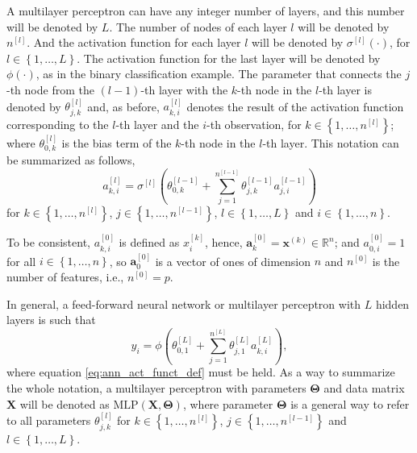 A multilayer perceptron can have any integer number of layers, and this number will be denoted by $L$. The number of nodes of each layer $l$ will be denoted by $n^{[l]}$. And the activation function for each layer $l$ will be denoted by $\sigma^{[l]}(\cdot)$, for $l \in \left\{ 1, \ldots, L \right\}$. The activation function for the last layer will be denoted by $\phi(\cdot)$, as in the binary classification example. The parameter that connects the $j$-th node from the $(l-1)$-th layer with the $k$-th node in the $l$-th layer is denoted by $\theta_{j,k}^{[l]}$ and, as before, $a_{k,i}^{[l]}$ denotes the result of the activation function corresponding to the $l$-th layer and the $i$-th observation, for $k \in \left\{ 1, \ldots, n^{[l]} \right\}$; where $\theta_{0,k}^{[l]}$ is the bias term of the $k$-th node in the $l$-th layer. This notation can be summarized as follows,
\begin{equation}
  \label{eq:ann_act_funct_def}
  a_{k,i}^{[l]} = \sigma^{[l]} \left( \theta_{0,k}^{[l-1]} + \sum_{j = 1}^{n^{[l-1]}} \theta_{j,k}^{[l-1]} a_{j,i}^{[l-1]} \right)
\end{equation}
for $k \in \left\{ 1, \ldots, n^{[l]} \right\}$, $j \in \left\{ 1, \ldots, n^{[l-1]} \right\}$, $l \in \left\{ 1, \ldots, L \right\}$ and $i \in \left\{ 1, \ldots, n \right\}$.

To be consistent, $a_{k,i}^{[0]}$ is defined as $x_i^{[k]}$, hence, $\boldsymbol{a}_{k}^{[0]} = \boldsymbol{x}^{(k)} \in \mathbb{R}^n$; and $a_{0,i}^{[0]} = 1$ for all $i \in \left\{ 1, \ldots, n \right\}$, so $\boldsymbol{a}_{0}^{[0]}$ is a vector of ones of dimension $n$ and $n^{[0]}$ is the number of features, i.e., $n^{[0]} = p$.

In general, a feed-forward neural network or multilayer perceptron with $L$ hidden layers is such that
\begin{equation}
  y_i = \phi \left( \theta_{0,1}^{[L]} +  \sum_{j = 1}^{n^{[L]}} \theta_{j,1}^{[L]} a_{k,i}^{[L]} \right),
\end{equation}
where equation \eqref{eq:ann_act_funct_def} must be held. As a way to summarize the whole notation, a multilayer perceptron with parameters $\boldsymbol{\Theta}$ and data matrix $\boldsymbol{X}$ will be denoted as $\mathrm{MLP} \left(\boldsymbol{X}, \boldsymbol{\Theta} \right)$, where parameter $\boldsymbol{\Theta}$ is a general way to refer to all parameters $\theta_{j,k}^{[l]}$ for $k \in \left\{ 1, \ldots, n^{[l]} \right\}$, $j \in \left\{ 1, \ldots, n^{[l-1]} \right\}$ and $l \in \left\{ 1, \ldots, L \right\}$.

